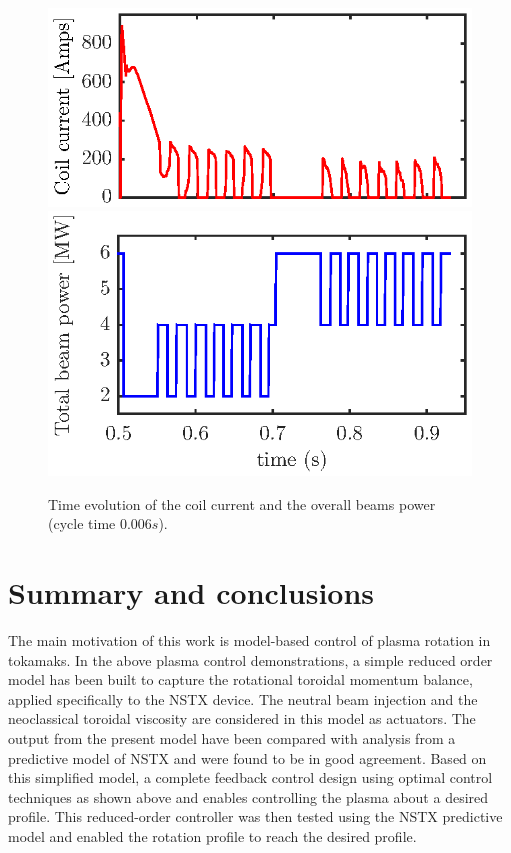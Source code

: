 \documentclass[12pt]{iopart}
\begin{document}
\begin{figure}
	\centering
	\includegraphics{imene_figs/fig20a}  \\[-0.5em] %
	\includegraphics{imene_figs/fig20b} 
	\caption{Time evolution of the coil current and the overall beams power (cycle time $0.006 s$). }
	\label{fig:rot17}
\end{figure}


\section{Summary and conclusions}
The main motivation of this work is model-based control of plasma rotation in tokamaks.
In the above plasma control demonstrations, a simple reduced order model has been built to capture the rotational toroidal momentum balance, applied specifically to the NSTX device. The neutral beam injection and the neoclassical toroidal viscosity are considered in this model as actuators. The output from the present model have been compared with analysis from a predictive model of NSTX and were found to be in good agreement.
Based on this simplified model, a complete feedback control design using optimal control techniques as shown above and enables controlling the plasma about a desired profile. This reduced-order controller was then tested using the NSTX predictive model and enabled the rotation profile to reach the desired profile.
\end{document}
